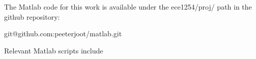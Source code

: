 %
%

\label{appendix:matlab}

The Matlab code for this work is available under the ece1254/proj/ path in the github repository:

\begin{center}
git@github.com:peeterjoot/matlab.git
\end{center}

Relevant Matlab scripts include


